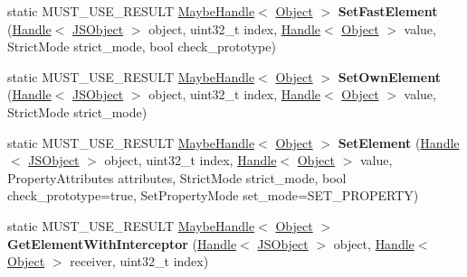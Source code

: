 \begin{DoxyCompactItemize}
\item 
\hypertarget{classv8_1_1internal_1_1_j_s_object_a48e87ae515d9d1a1ffcff3fbfdaf347f}{}static M\+U\+S\+T\+\_\+\+U\+S\+E\+\_\+\+R\+E\+S\+U\+L\+T \hyperlink{classv8_1_1internal_1_1_maybe_handle}{Maybe\+Handle}$<$ \hyperlink{classv8_1_1internal_1_1_object}{Object} $>$ {\bfseries Set\+Fast\+Element} (\hyperlink{classv8_1_1internal_1_1_handle}{Handle}$<$ \hyperlink{classv8_1_1internal_1_1_j_s_object}{J\+S\+Object} $>$ object, uint32\+\_\+t index, \hyperlink{classv8_1_1internal_1_1_handle}{Handle}$<$ \hyperlink{classv8_1_1internal_1_1_object}{Object} $>$ value, Strict\+Mode strict\+\_\+mode, bool check\+\_\+prototype)\label{classv8_1_1internal_1_1_j_s_object_a48e87ae515d9d1a1ffcff3fbfdaf347f}

\item 
\hypertarget{classv8_1_1internal_1_1_j_s_object_a675f691e7924f017d11a5628705b1af8}{}static M\+U\+S\+T\+\_\+\+U\+S\+E\+\_\+\+R\+E\+S\+U\+L\+T \hyperlink{classv8_1_1internal_1_1_maybe_handle}{Maybe\+Handle}$<$ \hyperlink{classv8_1_1internal_1_1_object}{Object} $>$ {\bfseries Set\+Own\+Element} (\hyperlink{classv8_1_1internal_1_1_handle}{Handle}$<$ \hyperlink{classv8_1_1internal_1_1_j_s_object}{J\+S\+Object} $>$ object, uint32\+\_\+t index, \hyperlink{classv8_1_1internal_1_1_handle}{Handle}$<$ \hyperlink{classv8_1_1internal_1_1_object}{Object} $>$ value, Strict\+Mode strict\+\_\+mode)\label{classv8_1_1internal_1_1_j_s_object_a675f691e7924f017d11a5628705b1af8}

\item 
\hypertarget{classv8_1_1internal_1_1_j_s_object_a72866a20c664e2179b07ebcf84ca32a7}{}static M\+U\+S\+T\+\_\+\+U\+S\+E\+\_\+\+R\+E\+S\+U\+L\+T \hyperlink{classv8_1_1internal_1_1_maybe_handle}{Maybe\+Handle}$<$ \hyperlink{classv8_1_1internal_1_1_object}{Object} $>$ {\bfseries Set\+Element} (\hyperlink{classv8_1_1internal_1_1_handle}{Handle}$<$ \hyperlink{classv8_1_1internal_1_1_j_s_object}{J\+S\+Object} $>$ object, uint32\+\_\+t index, \hyperlink{classv8_1_1internal_1_1_handle}{Handle}$<$ \hyperlink{classv8_1_1internal_1_1_object}{Object} $>$ value, Property\+Attributes attributes, Strict\+Mode strict\+\_\+mode, bool check\+\_\+prototype=true, Set\+Property\+Mode set\+\_\+mode=S\+E\+T\+\_\+\+P\+R\+O\+P\+E\+R\+T\+Y)\label{classv8_1_1internal_1_1_j_s_object_a72866a20c664e2179b07ebcf84ca32a7}

\item 
\hypertarget{classv8_1_1internal_1_1_j_s_object_a2691c69cb35ed45b544cb24bec448c7e}{}static M\+U\+S\+T\+\_\+\+U\+S\+E\+\_\+\+R\+E\+S\+U\+L\+T \hyperlink{classv8_1_1internal_1_1_maybe_handle}{Maybe\+Handle}$<$ \hyperlink{classv8_1_1internal_1_1_object}{Object} $>$ {\bfseries Get\+Element\+With\+Interceptor} (\hyperlink{classv8_1_1internal_1_1_handle}{Handle}$<$ \hyperlink{classv8_1_1internal_1_1_j_s_object}{J\+S\+Object} $>$ object, \hyperlink{classv8_1_1internal_1_1_handle}{Handle}$<$ \hyperlink{classv8_1_1internal_1_1_object}{Object} $>$ receiver, uint32\+\_\+t index)\label{classv8_1_1internal_1_1_j_s_object_a2691c69cb35ed45b544cb24bec448c7e}


\end{DoxyCompactItemize}
